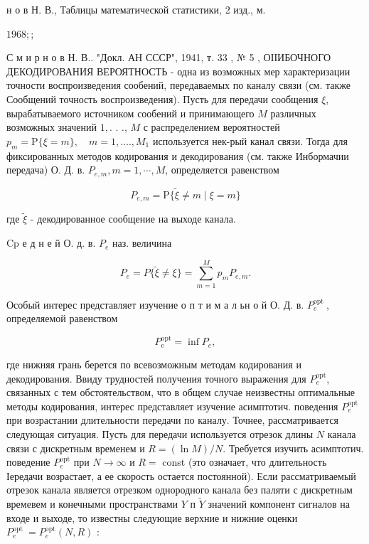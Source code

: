 \documentclass[10pt]{article}
\begin{document}
н о в Н. В., Таблицы математической статистики, 2 изд., м.

$1968 ;$;

С м и р н о в Н. В.. "Докл. АН СССР", 1941, т. 33 , № 5 , ОІІИБОЧНОГО ДЕКОДИРОВАНИЯ ВЕРОЯТНОСТЬ - одна из возможных мер характеризации точности воспроизведения сообений, передаваемых по каналу связи (см. также Сообщений точность воспроизведения). Пусть для передачи сообщения $\xi$, вырабатываемого источником сообений и принимающего $M$ различных возможных значений $1,$. . ., $M$ с распределением вероятностей $p_{m}=\mathrm{P}\{\xi=m\}, \quad m=1, \ldots ., M_{1}$ используется нек-рый канал связи. Тогда для фиксированных методов кодирования и декодирования (см. также Инбормачии передача) О. Д. в. $P_{e, m}, m=1, \cdots, M$, определяется равенством



\[

P_{e, m}=\mathrm{P}\{\tilde{\xi} \neq m \mid \xi=m\}

\]



где $\tilde{\xi}$ - декодированное сообщение на выходе канала.



$\mathrm{C} \mathrm{p}$ е д н е й $О$. д. в. $P_{e}$ наз. величина



\[

P_{e}=P\{\tilde{\xi} \neq \xi\}=\sum_{m=1}^{M} p_{m} P_{e, m} .

\]



Особый интерес представляет изучение о п т и м а л ьн о й О. Д. в. $P_{e}^{\text {opt }}$, определяемой равенством



\[

P_{\mathrm{e}}^{\mathrm{opt}}=\inf P_{e},

\]



где нижняя грань берется по всевозможным методам кодирования и декодирования. Ввиду трудностей получения точного выражения для $P_{e}^{\mathrm{opt}}$, связанных с тем обстоятельством, что в общем случае неизвестны оптимальные методы кодирования, интерес представляет изучение асимптотич. поведения $P_{e}^{\mathrm{opt}}$ при возрастании длительности передачи по каналу. Точнее, рассматривается следующая ситуация. Пусть для передачи используется отрезок длины $N$ канала связи с дискретным временем и $R=(\ln M) / N$. Требуется изучить асимптотич. поведение $P_{e}^{\mathrm{opt}}$ при $N \rightarrow \infty$ и $R=$ const (это означает, что длительность Іередачи возрастает, а ее скорость остается постоянной). Если рассматриваемый отрезок канала является отрезком однородного канала без паляти с дискретным времевем и конечными пространствами $Y$ п $\tilde{Y}$ значений компонент сигналов на входе и выходе, то известны следующие верхние и нижние оценки $P_{e}^{\text {opt }}=P_{e}^{\mathrm{opt}}(N, R)$ :
\end{document}
